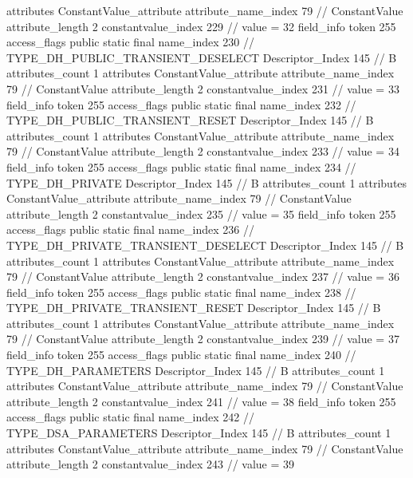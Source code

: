 {{{{{				attributes {
				ConstantValue_attribute {
					attribute_name_index	79		// ConstantValue
					attribute_length	2
					constantvalue_index	229		// value = 32
				}
				}
			}
			field_info {
				token	255
				access_flags	public static final
				name_index	230		// TYPE_DH_PUBLIC_TRANSIENT_DESELECT
				Descriptor_Index	145		// B
				attributes_count	1
				attributes {
				ConstantValue_attribute {
					attribute_name_index	79		// ConstantValue
					attribute_length	2
					constantvalue_index	231		// value = 33
				}
				}
			}
			field_info {
				token	255
				access_flags	public static final
				name_index	232		// TYPE_DH_PUBLIC_TRANSIENT_RESET
				Descriptor_Index	145		// B
				attributes_count	1
				attributes {
				ConstantValue_attribute {
					attribute_name_index	79		// ConstantValue
					attribute_length	2
					constantvalue_index	233		// value = 34
				}
				}
			}
			field_info {
				token	255
				access_flags	public static final
				name_index	234		// TYPE_DH_PRIVATE
				Descriptor_Index	145		// B
				attributes_count	1
				attributes {
				ConstantValue_attribute {
					attribute_name_index	79		// ConstantValue
					attribute_length	2
					constantvalue_index	235		// value = 35
				}
				}
			}
			field_info {
				token	255
				access_flags	public static final
				name_index	236		// TYPE_DH_PRIVATE_TRANSIENT_DESELECT
				Descriptor_Index	145		// B
				attributes_count	1
				attributes {
				ConstantValue_attribute {
					attribute_name_index	79		// ConstantValue
					attribute_length	2
					constantvalue_index	237		// value = 36
				}
				}
			}
			field_info {
				token	255
				access_flags	public static final
				name_index	238		// TYPE_DH_PRIVATE_TRANSIENT_RESET
				Descriptor_Index	145		// B
				attributes_count	1
				attributes {
				ConstantValue_attribute {
					attribute_name_index	79		// ConstantValue
					attribute_length	2
					constantvalue_index	239		// value = 37
				}
				}
			}
			field_info {
				token	255
				access_flags	public static final
				name_index	240		// TYPE_DH_PARAMETERS
				Descriptor_Index	145		// B
				attributes_count	1
				attributes {
				ConstantValue_attribute {
					attribute_name_index	79		// ConstantValue
					attribute_length	2
					constantvalue_index	241		// value = 38
				}
				}
			}
			field_info {
				token	255
				access_flags	public static final
				name_index	242		// TYPE_DSA_PARAMETERS
				Descriptor_Index	145		// B
				attributes_count	1
				attributes {
				ConstantValue_attribute {
					attribute_name_index	79		// ConstantValue
					attribute_length	2
					constantvalue_index	243		// value = 39
}}}}}}}
